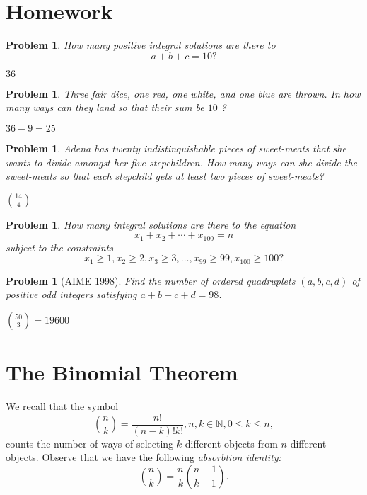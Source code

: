 \documentclass[11pt, openany]{book}
\theoremstyle{change} \theoremheaderfont{\blue\sffamily\bfseries}
\newtheorem{pro}[thm]{Problem}
\theoremstyle{nonumberplain} \theoremheaderfont{\sffamily\bfseries}
\newcommand{\BBN}{\mathbb{N}}
\def\binom#1#2{{#1\choose#2}}
\newcommand{\í}{\'{\i}}
\begin{document}
\section*{Homework}
\begin{multicols}{2}\columnseprule 1pt \columnsep 25pt
\begin{pro}
How many positive integral solutions are there to $$a + b + c =
10?$$
\begin{answer} $36$
\end{answer}
  \end{pro}
   \begin{pro}
Three fair dice, one red, one white, and one blue are thrown. In how
many ways can they land so that their sum be $10$ ?
\begin{answer} $36 - 9 = 25$
\end{answer}
  \end{pro}
   \begin{pro} Adena has twenty indistinguishable pieces of sweet-meats that
she wants to divide amongst her five stepchildren.  How many ways
can she divide the sweet-meats so that each stepchild gets at least
two pieces of sweet-meats?\begin{answer} $\binom{14}{4}$

\end{answer}
    \end{pro}
          \begin{pro}
How many integral solutions are there to the equation $$x_1 + x_2 +
\cdots + x_{100} = n
$$ subject to the constraints $$x_1 \geq 1, x_2 \geq 2, x_3 \geq 3, \ldots , x_{99} \geq 99, x_{100} \geq
100?$$

    \end{pro}
         \begin{pro}[AIME 1998] Find the number of ordered quadruplets $(a, b, c,
d)$ of positive odd integers satisfying $a+b+c+d=98$.
\begin{answer}$\binom{50}{3} = 19600$
\end{answer}
\end{pro}
\end{multicols}













\section{The Binomial Theorem} We recall that the
symbol $$\binom{n}{k} = \frac{n!}{(n - k)!k!}, n, k \in \BBN , 0
\leq k \leq n,$$ counts the number of ways of selecting $k$
different objects from $n$ different objects. Observe that we have
the following {\em absorbtion identity: }
$$\binom{n}{k} = \frac{n}{k}\binom{n - 1}{k - 1}.$$
\end{document}
